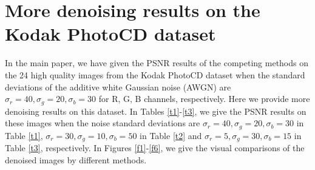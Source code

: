\documentclass[10pt,onecolumn,letterpaper]{article}
\begin{document}
\vspace{5mm}
\section{More denoising results on the Kodak PhotoCD dataset}

In the main paper, we have given the PSNR results of the competing methods on the 24 high quality images from the Kodak PhotoCD dataset when the standard deviations  of the additive white Gaussian noise (AWGN) are $\sigma_{r}=40, \sigma_{g}=20, \sigma_{b}=30$ for R, G, B channels, respectively. Here we provide more denoising results on this dataset. In Tables \ref{t1}-\ref{t3}, we give the PSNR results on these images when the noise standard deviations are $\sigma_{r}=40, \sigma_{g}=20, \sigma_{b}=30$ in Table \ref{t1}, $\sigma_{r}=30, \sigma_{g}=10, \sigma_{b}=50$ in Table \ref{t2} and $\sigma_{r}=5, \sigma_{g}=30, \sigma_{b}=15$ in Table \ref{t3}, respectively. In Figures \ref{f1}-\ref{f6}, we give the visual comparisons of the denoised images by different methods.
\end{document}
